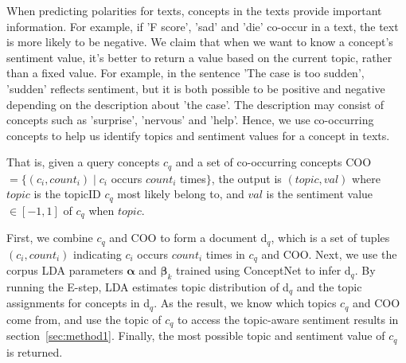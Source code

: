 When predicting polarities for texts, concepts in the texts provide important information. For example, if 'F score', 'sad' and 'die' co-occur in a text, the text is more likely to be negative. We claim that when we want to know a concept's sentiment value, it's better to return a value based on the current topic, rather than a fixed value. For example, in the sentence 'The case is too sudden', 'sudden' reflects sentiment, but it is both possible to be positive and negative depending on the description about 'the case'. The description may consist of concepts such as 'surprise', 'nervous' and 'help'. Hence, we use co-occurring concepts to help us identify topics and sentiment values for a concept in texts.

That is, given a query concepts $c_q$ and a set of co-occurring concepts COO $= \{(c_i, count_i) \mid c_i$ occurs $count_i$ times$\}$, the output is $(topic, val)$ where $topic$ is the topicID $c_q$ most likely belong to, and $val$ is the sentiment value $\in [-1, 1]$ of $c_q$ when $topic$.

First, we combine $c_q$ and COO to form a document d$_q$, which is a set of tuples $(c_i, count_i)$ indicating $c_i$ occurs $count_i$ times in $c_q$ and COO. Next, we use the corpus LDA parameters $\boldsymbol{\alpha}$ and $\boldsymbol{\beta}_k$ trained using ConceptNet to infer d$_q$. By running the E-step, LDA estimates topic distribution of d$_q$ and the topic assignments for concepts in d$_q$. As the result, we know which topics $c_q$ and COO come from, and use the topic of $c_q$ to access the topic-aware sentiment results in section~\ref{sec:method1}. Finally, the most possible topic and sentiment value of $c_q$ is returned.



